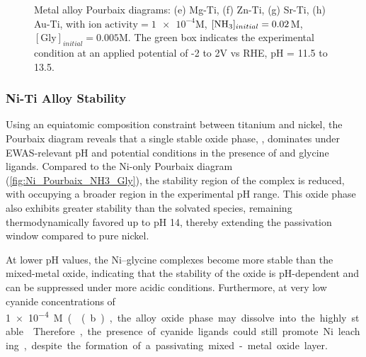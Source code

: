\documentclass[journal=jacsat,manuscript=article]{achemso}
\begin{document}
\begin{figure}[htbp]
\centering
{}
\caption{Metal alloy Pourbaix diagrams: (e) Mg-Ti, (f) Zn-Ti, (g) Sr-Ti, (h) Au-Ti, with $\text{ion activity}=\num{1e-4}$M, $[\ce{NH3}]_{initial}= 0.02$M, $[\text{Gly}]_{initial}=0.005$M. The green box indicates the experimental condition at an applied potential of -2 to 2V vs RHE, pH = 11.5 to 13.5.}
\label{fig:alloy_pourbaix_collage_2}
\end{figure}

\subsubsection{Ni-Ti Alloy Stability}
Using an equiatomic composition constraint between titanium and nickel, the Pourbaix diagram reveals that a single stable oxide phase, , dominates under EWAS-relevant pH and potential conditions in the presence of  and glycine ligands. Compared to the Ni-only Pourbaix diagram (\ref{fig:Ni_Pourbaix_NH3_Gly}), the stability region of the  complex is reduced, with  occupying a broader region in the experimental pH range. This oxide phase also exhibits greater stability than the solvated  species, remaining thermodynamically favored up to pH 14, thereby extending the passivation window compared to pure nickel. 

At lower pH values, the Ni–glycine complexes become more stable than the mixed-metal oxide, indicating that the stability of the oxide is pH-dependent and can be suppressed under more acidic conditions. Furthermore, at very low cyanide concentrations of \SI{1e-4}M ((b), the alloy oxide phase may dissolve into the highly stable . Therefore, the presence of cyanide ligands could still promote Ni leaching, despite the formation of a passivating mixed-metal oxide layer.
\end{document}
